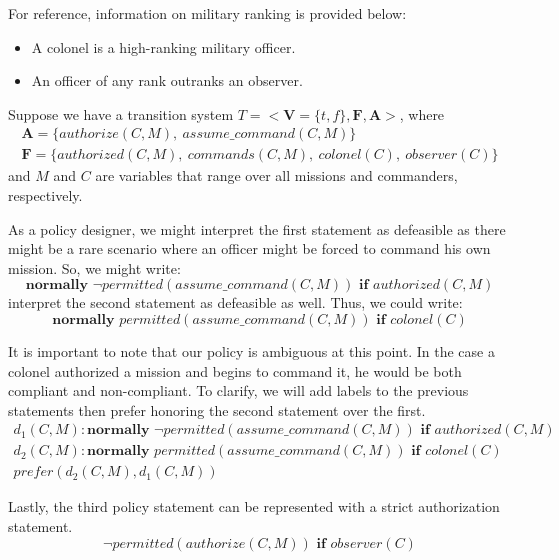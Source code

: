 For reference, information on military ranking is provided below:

\begin{itemize}
    \item A colonel is a high-ranking military officer.
    \item An officer of any rank outranks an observer.
\end{itemize}

Suppose we have a transition system $T=<\boldsymbol{V}=\{t,f\},\boldsymbol{F},\boldsymbol{A}>$, where
\begin{gather}
    \boldsymbol{A}=\{authorize(C,M),\ assume\_command(C, M)\} \\
    \boldsymbol{F}=\{authorized(C,M),\ commands(C,M),\ colonel(C),\ observer(C)\}
\end{gather}
and $M$ and $C$ are variables that range over all missions and commanders, respectively.

As a policy designer, we might interpret the first statement as defeasible as there might be a rare scenario where an officer might be forced to command his own mission.
So, we might write:
\[
\textbf{normally } \neg permitted(assume\_command(C, M)) \textbf{ if } authorized(C, M)
\]
\citet{gelfond_authorization_2008} interpret the second statement as defeasible as well.
Thus, we could write:
\[
\textbf{normally } permitted(assume\_command(C, M)) \textbf{ if } colonel(C)
\]

It is important to note that our policy is ambiguous at this point.
In the case a colonel authorized a mission and begins to command it, he would be both compliant and non-compliant.
To clarify, we will add labels to the previous statements then prefer honoring the second statement over the first.
\begin{gather}
    d_1(C, M): \textbf{normally } \neg permitted(assume\_command(C, M)) \textbf{ if } authorized(C, M) \label{eq:apl_example_policy_1} \\
    d_2(C, M): \textbf{normally } permitted(assume\_command(C, M)) \textbf{ if } colonel(C) \label{eq:apl_example_policy_2} \\
    prefer(d_2(C,M),d_1(C,M)) \label{eq:apl_example_policy_3}
\end{gather}

Lastly, the third policy statement can be represented with a strict authorization statement.
\begin{equation}
    \label{eq:apl_example_policy_4}
    \neg permitted(authorize(C, M)) \textbf{ if } observer(C)
\end{equation}

